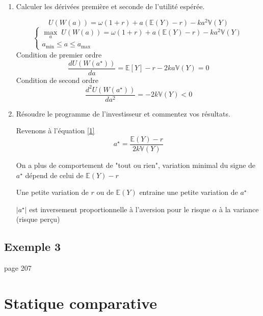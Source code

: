 \documentclass[a4paper, 12pt]{report}
\begin{document}
\begin{enumerate}
	\item Calculer les dérivées première et seconde de l'utilité espérée.
	
\[ U(W(a)) =  \omega(1+r)+a(\mathbb{E}(Y)-r) - ka^2 \mathbb{V}(Y) \]	
\[
\begin{cases}
	\underset{a}\max \; U(W(a)) = \omega(1+r)+a(\mathbb{E}(Y)-r) - ka^2 \mathbb{V}(Y) \\
	a_{\text{min}} \leq a \leq a_{\text{max}}
\end{cases}
\]
Condition de premier ordre 
\[
\frac{d U(W(a^{\star}))}{da} = \mathbb{E}[Y] - r -2ka \mathbb{V}(Y)= 0 \tag{1}\label{1}
\] 
Condition de second ordre
\[
\frac{d^2 U(W(a^{\star}))}{da^2} = -2k \mathbb{V}(Y)< 0 
\]

	\item Résoudre le programme de l'investisseur et commentez vos résultats.

\noindent
Revenons à l'équation \ref{1}
\[ a^{\star}=\frac{\mathbb{E}(Y)-r}{2k\mathbb{V}(Y)} \]

On a plus de comportement de "tout ou rien", variation minimal du signe de \( a^{\star} \) dépend de celui de \( \mathbb{E}(Y)-r \)

Une petite variation de \( r \) ou de \( \mathbb{E}(Y) \) entraine une petite variation de \( a^{\star} \)

\( \left| a^{\star} \right|\)  est inversement proportionnelle à l'aversion pour le risque \( \alpha \) à la variance (risque perçu)

\end{enumerate}

\subsection{Exemple 3}page 207



\section{Statique comparative}
\end{document}
